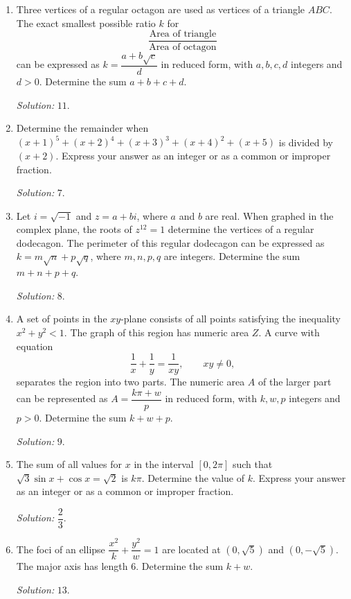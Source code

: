\documentclass[11pt]{article}
\begin{document}
\begin{enumerate}[label=\textbf{\arabic*.}]
\item Three vertices of a regular octagon are used as vertices of a triangle $ABC$. The exact smallest possible ratio $k$ for
\[
\frac{\text{Area of triangle}}{\text{Area of octagon}}
\]
can be expressed as $k=\dfrac{a+b\sqrt{c}}{d}$ in reduced form, with $a,b,c,d$ integers and $d>0$. Determine the sum $a+b+c+d$.\par\textit{Solution: }$11$.

\item Determine the remainder when $(x+1)^5+(x+2)^4+(x+3)^3+(x+4)^2+(x+5)$ is divided by $(x+2)$. Express your answer as an integer or as a common or improper fraction.\par\textit{Solution: }$7$.

\item Let $i=\sqrt{-1}$ and $z=a+bi$, where $a$ and $b$ are real. When graphed in the complex plane, the roots of $z^{12}=1$ determine the vertices of a regular dodecagon. The perimeter of this regular dodecagon can be expressed as $k=m\sqrt{n}+p\sqrt{q}$, where $m,n,p,q$ are integers. Determine the sum $m+n+p+q$.\par\textit{Solution: }$8$.

\item A set of points in the $xy$-plane consists of all points satisfying the inequality $x^2+y^2<1$. The graph of this region has numeric area $Z$. A curve with equation
\[
\frac{1}{x}+\frac{1}{y}=\frac{1}{xy},\qquad xy\ne 0,
\]
separates the region into two parts. The numeric area $A$ of the larger part can be represented as $A=\dfrac{k\pi+w}{p}$ in reduced form, with $k,w,p$ integers and $p>0$. Determine the sum $k+w+p$.\par\textit{Solution: }$9$.

\item The sum of all values for $x$ in the interval $[0,2\pi]$ such that $\sqrt{3}\sin x+\cos x=\sqrt{2}$ is $k\pi$. Determine the value of $k$. Express your answer as an integer or as a common or improper fraction.\par\textit{Solution: }$\dfrac{2}{3}$.

\item The foci of an ellipse $\dfrac{x^2}{k}+\dfrac{y^2}{w}=1$ are located at $(0,\sqrt{5})$ and $(0,-\sqrt{5})$. The major axis has length $6$. Determine the sum $k+w$.\par\textit{Solution: }$13$.
\end{enumerate}
\end{document}
